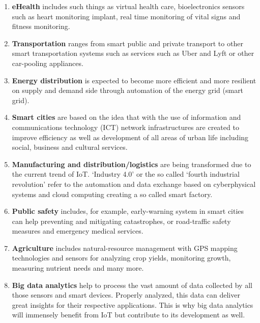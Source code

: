 		\begin{enumerate}
			\item \textbf{eHealth} includes such things as virtual health care, bioelectronics sensors such as heart monitoring implant, real time monitoring of vital signs and fitness monitoring. 

			\item \textbf{Transportation} ranges from smart public and private transport to other smart transportation systems such as services such as Uber and Lyft or other car-pooling appliances. 

			\item \textbf{Energy distribution} is expected to become more efficient and more resilient on supply and demand side through automation of the energy grid (smart grid).

			\item \textbf{Smart cities} are based on the idea that with the use of information and communications technology (ICT) network infrastructures are created to improve efficiency as well as development of all areas of urban life including social, business and cultural services.

			\item \textbf{Manufacturing and distribution/logistics} are being transformed due to the current trend of IoT. `Industry 4.0' or the so called `fourth industrial revolution' refer to the automation and data exchange based on cyberphysical systems and cloud computing creating a so called smart factory.

			\item \textbf{Public safety} includes, for example, early-warning system in smart cities can help preventing and mitigating catastrophes, or road-traffic safety measures and emergency medical services.

			\item \textbf{Agriculture} includes natural-resource management with GPS mapping technologies and sensors for analyzing crop yields, monitoring growth, measuring nutrient needs and many more. 

			\item \textbf{Big data analytics} help to process the vast amount of data collected by all those sensors and smart devices. Properly analyzed, this data can deliver great insights for their respective applications. This is why big data analytics will immensely benefit from IoT but contribute to its development as well.
		\end{enumerate}
		
